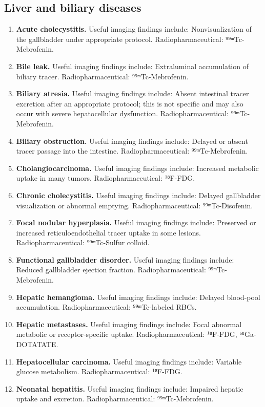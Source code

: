 \subsection{Liver and biliary diseases}
\begin{enumerate}[leftmargin=*,itemsep=0.45em,topsep=0.4em]
\item \textbf{Acute cholecystitis.} Useful imaging findings include: Nonvisualization of the gallbladder under appropriate protocol. Radiopharmaceutical: ⁹⁹ᵐTc-Mebrofenin.
\item \textbf{Bile leak.} Useful imaging findings include: Extraluminal accumulation of biliary tracer. Radiopharmaceutical: ⁹⁹ᵐTc-Mebrofenin.
\item \textbf{Biliary atresia.} Useful imaging findings include: Absent intestinal tracer excretion after an appropriate protocol; this is not specific and may also occur with severe hepatocellular dysfunction. Radiopharmaceutical: ⁹⁹ᵐTc-Mebrofenin.
\item \textbf{Biliary obstruction.} Useful imaging findings include: Delayed or absent tracer passage into the intestine. Radiopharmaceutical: ⁹⁹ᵐTc-Mebrofenin.
\item \textbf{Cholangiocarcinoma.} Useful imaging findings include: Increased metabolic uptake in many tumors. Radiopharmaceutical: ¹⁸F-FDG.
\item \textbf{Chronic cholecystitis.} Useful imaging findings include: Delayed gallbladder visualization or abnormal emptying. Radiopharmaceutical: ⁹⁹ᵐTc-Disofenin.
\item \textbf{Focal nodular hyperplasia.} Useful imaging findings include: Preserved or increased reticuloendothelial tracer uptake in some lesions. Radiopharmaceutical: ⁹⁹ᵐTc-Sulfur colloid.
\item \textbf{Functional gallbladder disorder.} Useful imaging findings include: Reduced gallbladder ejection fraction. Radiopharmaceutical: ⁹⁹ᵐTc-Mebrofenin.
\item \textbf{Hepatic hemangioma.} Useful imaging findings include: Delayed blood-pool accumulation. Radiopharmaceutical: ⁹⁹ᵐTc-labeled RBCs.
\item \textbf{Hepatic metastases.} Useful imaging findings include: Focal abnormal metabolic or receptor-specific uptake. Radiopharmaceutical: ¹⁸F-FDG, ⁶⁸Ga-DOTATATE.
\item \textbf{Hepatocellular carcinoma.} Useful imaging findings include: Variable glucose metabolism. Radiopharmaceutical: ¹⁸F-FDG.
\item \textbf{Neonatal hepatitis.} Useful imaging findings include: Impaired hepatic uptake and excretion. Radiopharmaceutical: ⁹⁹ᵐTc-Mebrofenin.
\end{enumerate}

